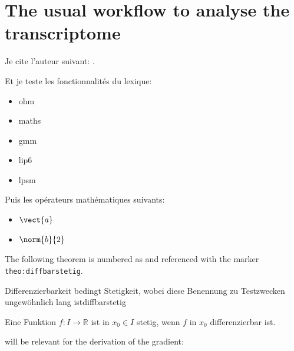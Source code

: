 \chapter{The usual workflow to analyse the transcriptome}

Je cite l'auteur suivant: \cite{Allgower1990}.

Et je teste les fonctionnalités du lexique:

\begin{itemize}
\item \gls{ohm}
\item \gls{maths}
\item \gls{gmm}
\item \gls{lip6}
\item \gls{lpsm}
\end{itemize}

Puis les opérateurs mathématiques suivants:

\begin{itemize}
    \item $\vect{a}$
    \item $\norm{b}{2}$
\end{itemize}




The following theorem is numbered as  and 
referenced with the marker \texttt{theo:diffbarstetig}.

\begin{Theorem}{Differenzierbarkeit bedingt Stetigkeit, wobei diese Benennung
zu Testzwecken ungew\"{o}hnlich lang ist}{diffbarstetig}%

Eine Funktion $f:I\to\mathbb{R}$ ist in $x_0\in I$ stetig, wenn $f$ in
$x_0$ differenzierbar ist.
\end{Theorem}


 will be relevant for the derivation of the gradient:

